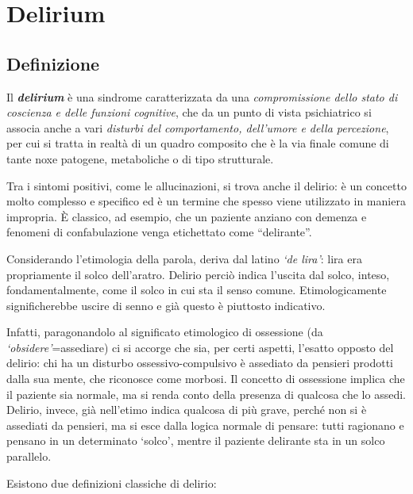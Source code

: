\section{Delirium}

\subsection{Definizione}

Il \textbf{\emph{delirium}} è una sindrome caratterizzata da una
\emph{compromissione dello stato di coscienza e delle funzioni
cognitive}, che da un punto di vista psichiatrico si associa anche a
vari \emph{disturbi del comportamento, dell'umore e della percezione},
per cui si tratta in realtà di un quadro composito che è la via finale
comune di tante noxe patogene, metaboliche o di tipo strutturale.

Tra i sintomi positivi, come le allucinazioni, si trova anche il
delirio: è un concetto molto complesso e specifico ed è un termine che
spesso viene utilizzato in maniera impropria. È classico, ad esempio,
che un paziente anziano con demenza e fenomeni di confabulazione venga
etichettato come ``delirante''.

Considerando l'etimologia della parola, deriva dal latino \emph{`de
lira'}: lira era propriamente il solco dell'aratro. Delirio perciò
indica l'uscita dal solco, inteso, fondamentalmente, come il solco in
cui sta il senso comune. Etimologicamente significherebbe uscire di
senno e già questo è piuttosto indicativo.

Infatti, paragonandolo al significato etimologico di ossessione (da
\emph{`obsidere'}=assediare) ci si accorge che sia, per certi aspetti,
l'esatto opposto del delirio: chi ha un disturbo ossessivo-compulsivo è
assediato da pensieri prodotti dalla sua mente, che riconosce come
morbosi. Il concetto di ossessione implica che il paziente sia normale,
ma si renda conto della presenza di qualcosa che lo assedi. Delirio,
invece, già nell'etimo indica qualcosa di più grave, perché non si è
assediati da pensieri, ma si esce dalla logica normale di pensare: tutti
ragionano e pensano in un determinato `solco', mentre il paziente
delirante sta in un solco parallelo.

Esistono due definizioni classiche di delirio:

